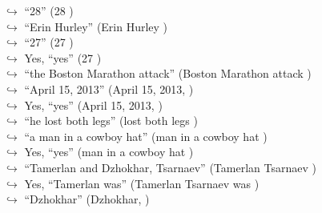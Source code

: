 \documentclass[11pt,a4paper, onecolumn]{article}
\begin{document}
\begin{figure}[t] \small \begin{tcolorbox}[boxsep=0pt,left=5pt,right=0pt,top=2pt,colback = yellow!5] \begin{dialogue}
 \small 
\colorbox{pink!25}{$\hookrightarrow$}
{ ``28'' (28 ) }
\\
\colorbox{pink!25}{$\hookrightarrow$}
{ ``Erin Hurley'' (Erin Hurley ) }
\\
\colorbox{pink!25}{$\hookrightarrow$}
{ ``27'' (27 ) }
\\
\colorbox{pink!25}{$\hookrightarrow$}
\colorbox{red!25}{Yes,}
{ ``yes'' (27 ) }
\\
\colorbox{pink!25}{$\hookrightarrow$}
{ ``the Boston Marathon attack'' (Boston Marathon attack ) }
\\
\colorbox{pink!25}{$\hookrightarrow$}
{ ``April 15, 2013'' (April 15, 2013, ) }
\\
\colorbox{pink!25}{$\hookrightarrow$}
\colorbox{red!25}{Yes,}
{ ``yes'' (April 15, 2013, ) }
\\
\colorbox{pink!25}{$\hookrightarrow$}
{ ``he lost both legs'' (lost both legs ) }
\\
\colorbox{pink!25}{$\hookrightarrow$}
{ ``a man in a cowboy hat'' (man in a cowboy hat ) }
\\
\colorbox{pink!25}{$\hookrightarrow$}
\colorbox{red!25}{Yes,}
{ ``yes'' (man in a cowboy hat ) }
\\
\colorbox{pink!25}{$\hookrightarrow$}
{ ``Tamerlan and Dzhokhar, Tsarnaev'' (Tamerlan Tsarnaev ) }
\\
\colorbox{pink!25}{$\hookrightarrow$}
\colorbox{red!25}{Yes,}
{ ``Tamerlan was'' (Tamerlan Tsarnaev was ) }
\\
\colorbox{pink!25}{$\hookrightarrow$}
{ ``Dzhokhar'' (Dzhokhar, ) }
\\

\end{dialogue}
\end{tcolorbox}
\end{figure}
\end{document}
